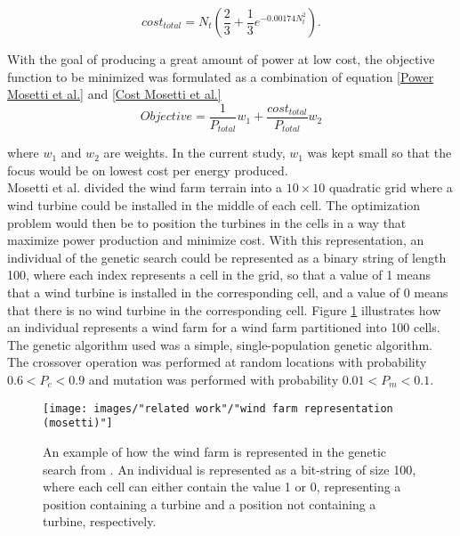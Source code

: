 \begin{equation}
\label{Cost Mosetti et al.}
cost_{total} = N_t \left( \frac{2}{3} + \frac{1}{3}e^{-0.00174N_t^2} \right).
\end{equation}

\noindent With the goal of producing a great amount of power at low cost, the objective function to be minimized was formulated as a combination of equation \ref{Power Mosetti et al.} and \ref{Cost Mosetti et al.}\\


\begin{equation}
Objective = \frac{1}{P_{total}}w_1 + \frac{cost_{total}}{P_{total}}w_2
\label{Objective function Mosetti et al.}
\end{equation}


\noindent where $w_1$ and $w_2$ are weights. In the current study, $w_1$ was kept small so that the focus would be on lowest cost per energy produced. \\

\noindent Mosetti et al. divided the wind farm terrain into a $10\times10$ quadratic grid where a wind turbine could be installed in the middle of each cell. The optimization problem would then be to position the turbines in the cells in a way that maximize power production and minimize cost. With this representation, an individual of the genetic search could be represented as a binary string of length 100, where each index represents a cell in the grid, so that a value of 1 means that a wind turbine is installed in the corresponding cell, and a value of 0 means that there is no wind turbine in the corresponding cell. Figure \ref{Wind Farm Representation} illustrates how an individual represents a wind farm for a wind farm partitioned into 100 cells. The genetic algorithm used was a simple, single-population genetic algorithm. The crossover operation was performed at random locations with probability $0.6 < P_c < 0.9$ and mutation was performed with probability $0.01 < P_m < 0.1$. \\


\begin{figure}[h!]
\begin{center}
\texttt{[image: images/"related work"/"wind farm representation (mosetti)"]}
\caption{An example of how the wind farm is represented in the genetic search from \cite{Mosetti}. An individual is represented as a bit-string of size 100, where each cell can either contain the value 1 or 0, representing a position containing a turbine and a position not containing a turbine, respectively.}
\label{Wind Farm Representation}
\end{center}
\end{figure}


